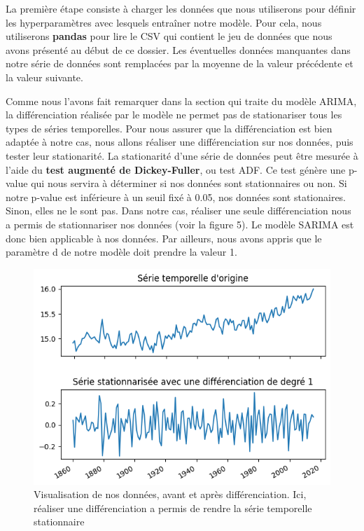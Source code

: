 \documentclass[french]{article}
\begin{document}
    La première étape consiste à charger les données que nous utiliserons pour définir les hyperparamètres avec lesquels entraîner notre modèle. Pour cela, nous utiliserons \textbf{pandas} pour lire le CSV qui contient le jeu de données que nous avons présenté au début de ce dossier. Les éventuelles données manquantes dans notre série de données sont remplacées par la moyenne de la valeur précédente et la valeur suivante.

    Comme nous l'avons fait remarquer dans la section qui traite du modèle ARIMA, la différenciation réalisée par le modèle ne permet pas de stationariser tous les types de séries temporelles. Pour nous assurer que la différenciation est bien adaptée à notre cas, nous allons réaliser une différenciation sur nos données, puis tester leur stationarité.
    La stationarité d'une série de données peut être mesurée à l'aide du \textbf{test augmenté de Dickey-Fuller}, ou test ADF. Ce test génère une p-value qui nous servira à déterminer si nos données sont stationnaires ou non. Si notre p-value est inférieure à un seuil fixé à 0.05, nos données sont stationaires. Sinon, elles ne le sont pas.
    Dans notre cas, réaliser une seule différenciation nous a permis de stationnariser nos données (voir la figure 5). Le modèle SARIMA est donc bien applicable à nos données. Par ailleurs, nous avons appris que le paramètre d de notre modèle doit prendre la valeur 1.
    \begin{figure}[h]
        \includegraphics[width=12cm]{differenciating}
        \centering
        \caption{Visualisation de nos données, avant et après différenciation. Ici, réaliser une différenciation a permis de rendre la série temporelle stationnaire}
        \centering
    \end{figure}
\end{document}
